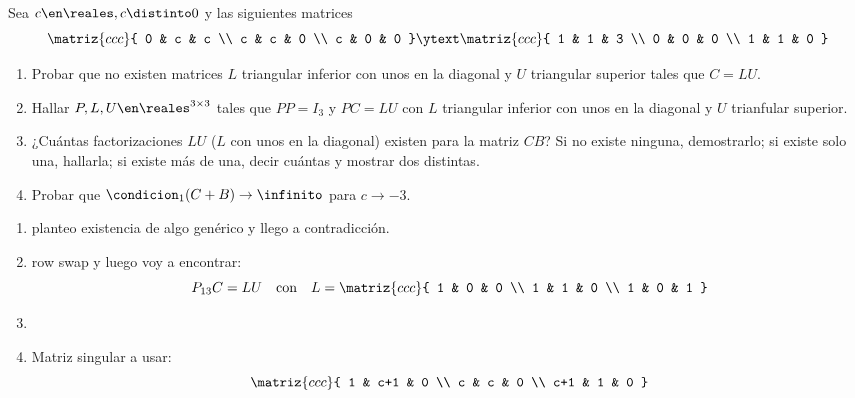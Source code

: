 \begin{enunciado}{\ejExtra}
  Sea $c \en \reales, c \distinto 0$ y las siguientes matrices
  $$
    \matriz{ccc}{
      0 & c & c \\
      c & c & 0 \\
      c & 0 & 0
    }
    \ytext
    \matriz{ccc}{
      1 & 1 & 3 \\
      0 & 0 & 0 \\
      1 & 1 & 0
    }
  $$
  \begin{enumerate}[label=\alph*)]
    \item Probar que no existen matrices $L$ triangular inferior con unos en la diagonal y $U$
          triangular superior tales que $C = LU$.

    \item Hallar $P, L, U \en \reales^{3 \times 3}$ tales que $PP = I_3$ y $PC = LU$ con $L$ triangular inferior con unos
          en la diagonal y $U$ trianfular superior.

    \item ¿Cuántas factorizaciones $LU$ ($L$ con unos en la diagonal) existen para la matriz $CB$?
          Si no existe ninguna, demostrarlo; si existe solo una, hallarla; si existe más de una, decir cuántas y mostrar dos distintas.

    \item Probar que $\condicion_1(C+B) \to \infinito$ para $c \to -3$.
  \end{enumerate}
\end{enunciado}

\begin{enumerate}[label=\alph*)]
  \item planteo existencia de algo genérico y llego a contradicción.
  \item row swap y luego voy a encontrar:
        $$
          P_{13} C = LU
          \quad
          \text{con}
          \quad
          L  =
          \matriz{ccc}{
            1 & 0 & 0 \\
            1 & 1 & 0 \\
            1 & 0 & 1
          }
        $$
  \item \hacer
  \item Matriz singular a usar:
        $$
          \matriz{ccc}{
            1 & c+1 & 0 \\
            c & c & 0 \\
            c+1 & 1 & 0
          }
        $$
\end{enumerate}

